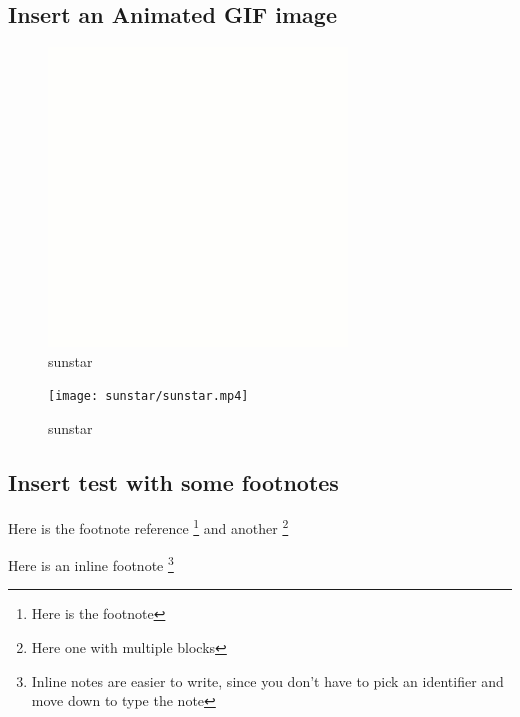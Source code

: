 \documentclass[]{article}
\let\rmarkdownfootnote\footnote%
\def\footnote{\protect\rmarkdownfootnote}
\begin{document}
\subsection{Insert an Animated GIF
image}\label{insert-an-animated-gif-image}

\begin{figure}
\centering
\includegraphics{sunstar/sunstar.gif}
\caption{sunstar}
\end{figure}

\begin{figure}
\centering
\texttt{[image: sunstar/sunstar.mp4]}
\caption{sunstar}
\end{figure}

\subsection{Insert test with some
footnotes}\label{insert-test-with-some-footnotes}

Here is the footnote reference \footnote{Here is the footnote} and
another \footnote{Here one with multiple blocks}

Here is an inline footnote \footnote{Inline notes are easier to write,
  since you don't have to pick an identifier and move down to type the
  note}
\end{document}

